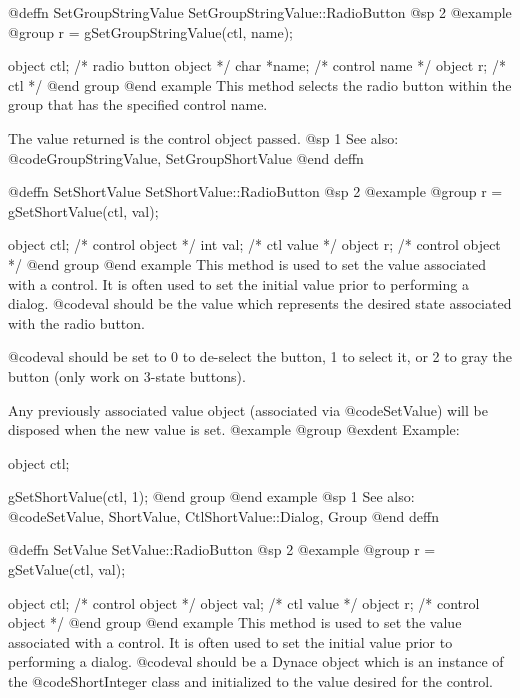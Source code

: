 {@deffn {SetGroupStringValue} SetGroupStringValue::RadioButton
@sp 2
@example
@group
r = gSetGroupStringValue(ctl, name);

object  ctl;    /*  radio button object  */
char    *name;  /*  control name         */
object  r;      /*  ctl                  */
@end group
@end example
This method selects the radio button within the group that has the
specified control name.

The value returned is the control object passed.
@sp 1
See also:  @code{GroupStringValue, SetGroupShortValue}
@end deffn







@deffn {SetShortValue} SetShortValue::RadioButton
@sp 2
@example
@group
r = gSetShortValue(ctl, val);

object  ctl;    /*  control object  */
int     val;    /*  ctl value       */
object  r;      /*  control object  */
@end group
@end example
This method is used to set the value associated with a control.  It is
often used to set the initial value prior to performing a dialog.
@code{val} should be the value which represents the desired state associated
with the radio button.

@code{val} should be set to 0 to de-select the button, 1 to select it, or 2 to
gray the button (only work on 3-state buttons).

Any previously associated value object (associated via @code{SetValue})
will be disposed when the new value is set.
@example
@group
@exdent Example:

object  ctl;

gSetShortValue(ctl, 1);
@end group
@end example
@sp 1
See also:  @code{SetValue, ShortValue, CtlShortValue::Dialog, Group}
@end deffn
















@deffn {SetValue} SetValue::RadioButton
@sp 2
@example
@group
r = gSetValue(ctl, val);

object  ctl;    /*  control object  */
object  val;    /*  ctl value       */
object  r;      /*  control object  */
@end group
@end example
This method is used to set the value associated with a control.  It is
often used to set the initial value prior to performing a dialog.
@code{val} should be a Dynace object which is an instance of the
@code{ShortInteger} class and initialized to the value desired for the
control.

}
